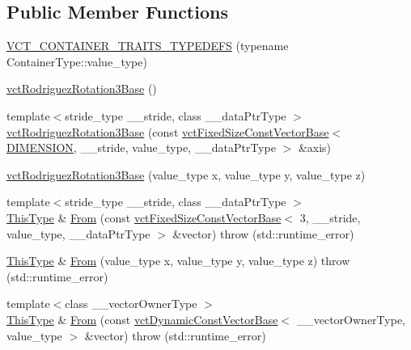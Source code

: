 \subsection*{Public Member Functions}
\begin{DoxyCompactItemize}
\item 
\hyperlink{classvct_rodriguez_rotation3_base_aee9fda6d51e757dafc3f8d5040aa21a7}{V\-C\-T\-\_\-\-C\-O\-N\-T\-A\-I\-N\-E\-R\-\_\-\-T\-R\-A\-I\-T\-S\-\_\-\-T\-Y\-P\-E\-D\-E\-F\-S} (typename Container\-Type\-::value\-\_\-type)
\item 
\hyperlink{classvct_rodriguez_rotation3_base_ae3fd3c80088abb2f03c5306ef895ad31}{vct\-Rodriguez\-Rotation3\-Base} ()
\item 
{\footnotesize template$<$stride\-\_\-type \-\_\-\-\_\-stride, class \-\_\-\-\_\-data\-Ptr\-Type $>$ }\\\hyperlink{classvct_rodriguez_rotation3_base_a900b5652df5978faf2f7052a99a22b4f}{vct\-Rodriguez\-Rotation3\-Base} (const \hyperlink{classvct_fixed_size_const_vector_base}{vct\-Fixed\-Size\-Const\-Vector\-Base}$<$ \hyperlink{classvct_rodriguez_rotation3_base_a37ad88df67e2e291c207a9d2892148c1a251299ef32f4c700fad09c8639bcce3a}{D\-I\-M\-E\-N\-S\-I\-O\-N}, \-\_\-\-\_\-stride, value\-\_\-type, \-\_\-\-\_\-data\-Ptr\-Type $>$ \&axis)
\item 
\hyperlink{classvct_rodriguez_rotation3_base_af09eda928d2d32adb1b81e48d85f2c91}{vct\-Rodriguez\-Rotation3\-Base} (value\-\_\-type x, value\-\_\-type y, value\-\_\-type z)
\item 
{\footnotesize template$<$stride\-\_\-type \-\_\-\-\_\-stride, class \-\_\-\-\_\-data\-Ptr\-Type $>$ }\\\hyperlink{classvct_rodriguez_rotation3_base_add2bccab7f6e86c98b3f97fd00b06dcc}{This\-Type} \& \hyperlink{classvct_rodriguez_rotation3_base_aff389cf931841e2766d345425de672ea}{From} (const \hyperlink{classvct_fixed_size_const_vector_base}{vct\-Fixed\-Size\-Const\-Vector\-Base}$<$ 3, \-\_\-\-\_\-stride, value\-\_\-type, \-\_\-\-\_\-data\-Ptr\-Type $>$ \&vector)  throw (std\-::runtime\-\_\-error)
\item 
\hyperlink{classvct_rodriguez_rotation3_base_add2bccab7f6e86c98b3f97fd00b06dcc}{This\-Type} \& \hyperlink{classvct_rodriguez_rotation3_base_aeaff60fbe583c21471677e67f90c1dc1}{From} (value\-\_\-type x, value\-\_\-type y, value\-\_\-type z)  throw (std\-::runtime\-\_\-error)
\item 
{\footnotesize template$<$class \-\_\-\-\_\-vector\-Owner\-Type $>$ }\\\hyperlink{classvct_rodriguez_rotation3_base_add2bccab7f6e86c98b3f97fd00b06dcc}{This\-Type} \& \hyperlink{classvct_rodriguez_rotation3_base_af2f94d3217ca58f127175b6e0209c24c}{From} (const \hyperlink{classvct_dynamic_const_vector_base}{vct\-Dynamic\-Const\-Vector\-Base}$<$ \-\_\-\-\_\-vector\-Owner\-Type, value\-\_\-type $>$ \&vector)  throw (std\-::runtime\-\_\-error)

\end{DoxyCompactItemize}

